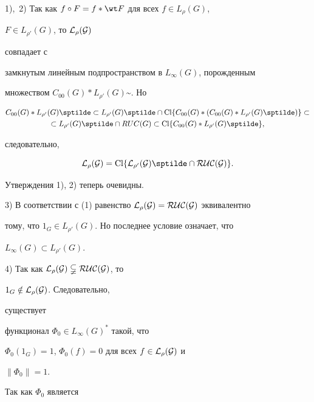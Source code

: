 \begin{pf}


1),~2) Так как $f\circ F=f\ast\wt F$ для всех $f\in L_\rho(G)$,


$F\in L_{\rho'}(G)$, то $\cal L_\rho(G)$


совпадает с


замкнутым линейным подпространством в $L_\infty(G)$, порожденным


множеством $C_{00}(G)\ast L_{\rho'}(G)\sptilde$. Но


\begin{multline*}


C_{00}(G)\ast L_{\rho'}(G)\sptilde\subset L_{\rho'}(G)\sptilde


\cap\Cl\{C_{00}(G)\ast(C_{00}(G)\ast L_{\rho'}(G)\sptilde)\}\subset \\


\subset L_{\rho'}(G)\sptilde\cap RUC(G)\subset\Cl


\{C_{00}(G)\ast L_{\rho'}(G)\sptilde\},


\end{multline*}


следовательно,


\begin{equation}


\cal L_\rho(G)=\Cl\{L_{\rho'}(G)\sptilde\cap RUC(G)\}.


\end{equation}


Утверждения 1), 2) теперь очевидны.





3) В соответствии с (1) равенство $\cal L_\rho(G)=RUC(G)$ эквивалентно


тому, что $1_G\in L_{\rho'}(G)$. Но последнее условие означает, что


$L_\infty(G)\subset L_{\rho'}(G)$.





4) Так как $\cal L_\rho(G)\subsetneqq RUC(G)$, то


$1_G\notin\cal L_\rho(G)$. Следовательно,


существует


функционал $\Phi_0\in L_\infty(G)^*$ такой, что


$\Phi_0(1_G)=1$, $\Phi_0(f)=0$ для всех $f\in\cal L_\rho(G)$ и


$\|\Phi_0\|=1$.


Так как $\Phi_0$ является



\end{pf}
